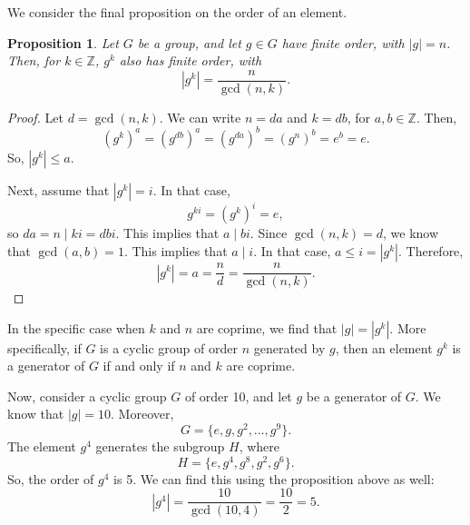\documentclass[a4paper, openany]{memoir}
\theoremstyle{definition}
\theoremstyle{plain}
\newtheorem{proposition}[definition]{Proposition}
\begin{document}
We consider the final proposition on the order of an element.
\begin{proposition}
Let $G$ be a group, and let $g \in G$ have finite order, with $|g| = n$. Then, for $k \in \mathbb{Z}$, $g^k$ also has finite order, with
\[|g^k| = \frac{n}{\gcd(n, k)}.\]
\end{proposition}
\begin{proof}
Let $d = \gcd(n, k)$. We can write $n = da$ and $k = db$, for $a, b \in \mathbb{Z}$. Then,
\[(g^k)^a = (g^{db})^a = (g^{da})^b = (g^n)^b = e^b = e.\]
So, $|g^k| \leqslant a$.

\noindent Next, assume that $|g^k| = i$. In that case, 
\[g^{ki} = (g^k)^i = e,\]
so $da = n \mid ki = dbi$. This implies that $a \mid bi$. Since $\gcd(n, k) = d$, we know that $\gcd(a, b) = 1$. This implies that $a \mid i$. In that case, $a \leqslant i = |g^k|$. Therefore,
\[|g^k| = a = \frac{n}{d} = \frac{n}{\gcd(n, k)}.\]
\end{proof}
In the specific case when $k$ and $n$ are coprime, we find that $|g| = |g^k|$. More specifically, if $G$ is a cyclic group of order $n$ generated by $g$, then an element $g^k$ is a generator of $G$ if and only if $n$ and $k$ are coprime.

Now, consider a cyclic group $G$ of order 10, and let $g$ be a generator of $G$. We know that $|g| = 10$. Moreover,
\[G = \{e, g, g^2, \dots, g^9\}.\]
The element $g^4$ generates the subgroup $H$, where
\[H = \{e, g^4, g^8, g^2, g^6\}.\]
So, the order of $g^4$ is 5. We can find this using the proposition above as well:
\[|g^4| = \frac{10}{\gcd(10, 4)} = \frac{10}{2} = 5.\]
\end{document}
